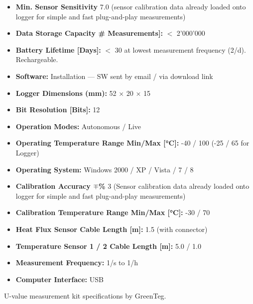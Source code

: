 \begin{theappendices}
\begin{table}[tbh]
\begin{framed}
\begin{itemize}[topsep=1pt,itemsep=1pt,partopsep=1pt, parsep=1pt]
    \item \textbf{Min. Sensor Sensitivity} 
    7.0 (sensor calibration data already loaded onto logger for simple and fast plug-and-play measurements)
    \item \textbf{Data Storage Capacity \# Measurements]:} $<$ 2’000’000
    \item \textbf{Battery Lifetime [Days]:} $<$ 30 at lowest measurement frequency (2/d). Rechargeable.
    \item \textbf{Software:} Installation — SW sent by email / via download link
    \item \textbf{Logger Dimensions (mm):} 52 × 20 × 15
    \item \textbf{Bit Resolution [Bits]:} 12
    \item \textbf{Operation Modes:} Autonomous / Live
    \item \textbf{Operating Temperature Range Min/Max [°C]:} -40 / 100 (-25 / 65 for Logger)
    \item \textbf{Operating System:} Windows 2000 / XP / Vista / 7 / 8
    \item \textbf{Calibration Accuracy $\mp$\%} 3 (Sensor calibration data already loaded onto logger for simple and fast plug-and-play measurements)
    \item \textbf{Calibration Temperature Range Min/Max [°C]:} -30 / 70
    \item \textbf{Heat Flux Sensor Cable Length [m]:} 1.5 (with connector)
    \item \textbf{Temperature Sensor 1 / 2 Cable Length [m]:} 5.0 / 1.0
    \item \textbf{Measurement Frequency:} 1/s to 1/h
    \item \textbf{Computer Interface:} USB     
\end{itemize}
\end{framed}
\caption{U-value measurement kit specifications by GreenTeg.}
\label{tab:u-value-measurement-kit}
\end{table}


\footnotesize
\singlespacing

\end{theappendices}
